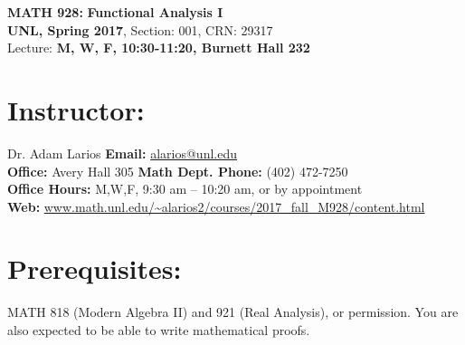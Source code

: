 \documentclass[margin]{res}
\theoremstyle{plain}
\theoremstyle{definition}
\theoremstyle{remark}
\begin{document}
\begin{center}
   \textbf{MATH 928:} 
   \textbf{Functional Analysis I}\\
   \textbf{UNL, Spring 2017}, Section: 001, CRN: 29317
    \\
   Lecture: \textbf{M, W, F, 10:30-11:20, Burnett Hall 232}\\
\end{center}
%
\vspace{-0.2in}
%
\begin{resume}
\section{Instructor:} Dr. Adam Larios 
\hfill \textbf{Email:} 
\url{alarios@unl.edu}
\\
\textbf{Office:} Avery Hall 305
\hfill
\textbf{Math Dept. Phone:} (402) 472-7250
\\
\textbf{Office Hours:} M,W,F, 9:30 am -- 10:20 am, or by appointment
\hfill
\\
\textbf{Web:} \url{www.math.unl.edu/~alarios2/courses/2017_fall_M928/content.html}



 \section{Prerequisites:} MATH 818 (Modern Algebra II) and 921 (Real Analysis), or permission.    You are also expected to be able to write mathematical proofs. 
 
 
 

\end{resume}
\end{document}
